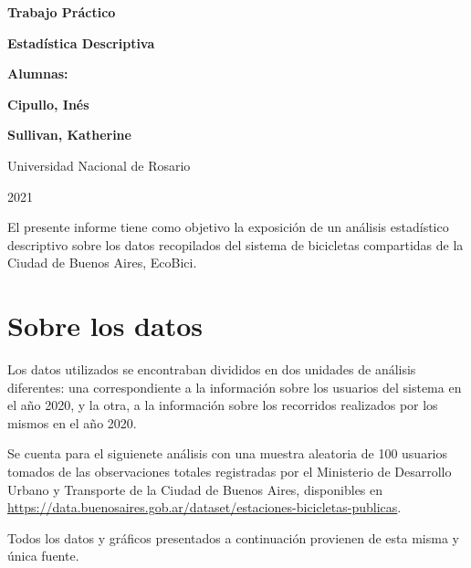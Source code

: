 \documentclass[11pt]{article}
\begin{document}
\begin{titlepage}
    \begin{center}
        \vfill
        \vfill
            \vspace{0.7cm}
            \noindent\textbf{\Huge Trabajo Pr\'actico}\par
            \noindent\textbf{\Huge Estad\'istica Descriptiva}\par
            \vspace{.5cm}
        \vfill
        \noindent \textbf{\huge Alumnas:}\par
        \vspace{.5cm}
        \noindent \textbf{\Large Cipullo, In\'es}\par
        \noindent \textbf{\Large Sullivan, Katherine}\par
 
        \vfill
        \large Universidad Nacional de Rosario \par
        \noindent\large 2021
    \end{center}
\end{titlepage}
\par

El presente informe tiene como objetivo la exposici\'on de un an\'alisis estad\'istico descriptivo
sobre los datos recopilados del sistema de bicicletas compartidas de la Ciudad de Buenos Aires, EcoBici.

\section{Sobre los datos}
Los datos utilizados se encontraban divididos en dos unidades de an\'alisis diferentes: una correspondiente
a la informaci\'on sobre los usuarios del sistema en el a\~{n}o 2020, y la otra, a la informaci\'on sobre los recorridos 
realizados por los mismos en el a\~{n}o 2020.
\par
Se cuenta para el siguienete an\'alisis con una muestra aleatoria de 100 usuarios
tomados de las observaciones totales registradas por el Ministerio de Desarrollo Urbano y Transporte de la
Ciudad de Buenos Aires, disponibles en {\small \url{https://data.buenosaires.gob.ar/dataset/estaciones-bicicletas-publicas}}.
\par
Todos los datos y gr\'aficos presentados a continuaci\'on provienen de esta misma y \'unica fuente.
\end{document}
